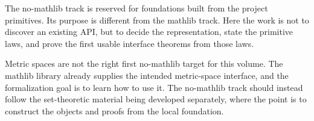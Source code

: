 
\begin{remark*}[Scope]
The no-mathlib track is reserved for foundations built from
the project primitives. Its purpose is different from the mathlib track. Here
the work is not to discover an existing API, but to decide the representation,
state the primitive laws, and prove the first usable interface theorems from
those laws.
\end{remark*}

\begin{remark*}
Metric spaces are not the right first no-mathlib target for this volume. The
mathlib library already supplies the intended metric-space interface, and the
formalization goal is to learn how to use it. The no-mathlib track should
instead follow the set-theoretic material being developed separately, where
the point is to construct the objects and proofs from the local foundation.
\end{remark*}
